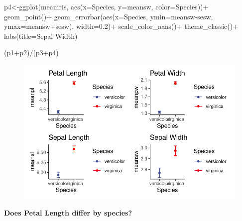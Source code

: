 \documentclass[
  letterpaper,
  DIV=11,
  numbers=noendperiod]{scrartcl}
\newenvironment{Shaded}{\begin{snugshade}}{\end{snugshade}}
\newcommand{\AttributeTok}[1]{\textcolor[rgb]{0.40,0.45,0.13}{#1}}
\newcommand{\FloatTok}[1]{\textcolor[rgb]{0.68,0.00,0.00}{#1}}
\newcommand{\FunctionTok}[1]{\textcolor[rgb]{0.28,0.35,0.67}{#1}}
\newcommand{\NormalTok}[1]{\textcolor[rgb]{0.00,0.23,0.31}{#1}}
\newcommand{\OtherTok}[1]{\textcolor[rgb]{0.00,0.23,0.31}{#1}}
\newcommand{\SpecialCharTok}[1]{\textcolor[rgb]{0.37,0.37,0.37}{#1}}
\newcommand{\StringTok}[1]{\textcolor[rgb]{0.13,0.47,0.30}{#1}}
\begin{document}
\begin{Shaded}
\begin{Highlighting}[]
\NormalTok{p4}\OtherTok{\textless{}{-}}\FunctionTok{ggplot}\NormalTok{(meaniris, }\FunctionTok{aes}\NormalTok{(}\AttributeTok{x=}\NormalTok{Species, }\AttributeTok{y=}\NormalTok{meansw, }\AttributeTok{color=}\NormalTok{Species))}\SpecialCharTok{+}
  \FunctionTok{geom\_point}\NormalTok{()}\SpecialCharTok{+}
  \FunctionTok{geom\_errorbar}\NormalTok{(}\FunctionTok{aes}\NormalTok{(}\AttributeTok{x=}\NormalTok{Species, }\AttributeTok{ymin=}\NormalTok{meansw}\SpecialCharTok{{-}}\NormalTok{sesw, }\AttributeTok{ymax=}\NormalTok{meansw}\SpecialCharTok{+}\NormalTok{sesw), }\AttributeTok{width=}\FloatTok{0.2}\NormalTok{)}\SpecialCharTok{+}
  \FunctionTok{scale\_color\_aaas}\NormalTok{()}\SpecialCharTok{+}
  \FunctionTok{theme\_classic}\NormalTok{()}\SpecialCharTok{+}
  \FunctionTok{labs}\NormalTok{(}\AttributeTok{title=}\StringTok{\textquotesingle{}Sepal Width\textquotesingle{}}\NormalTok{)}

\NormalTok{(p1}\SpecialCharTok{+}\NormalTok{p2)}\SpecialCharTok{/}\NormalTok{(p3}\SpecialCharTok{+}\NormalTok{p4)}
\end{Highlighting}
\end{Shaded}

\begin{figure}[H]

{\centering \includegraphics{cor_reg_chi_files/figure-pdf/unnamed-chunk-34-1.pdf}

}

\end{figure}

\textbf{Does Petal Length differ by species?}
\end{document}
